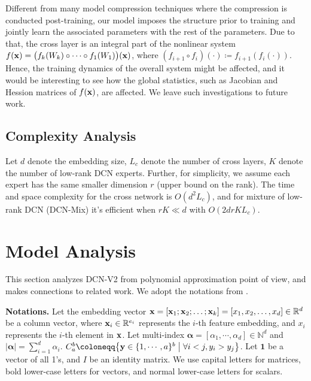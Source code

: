 \documentclass[sigconf]{acmart}
\newcommand{\vecx}{{\bf x}}
\newcommand{\vecy}{{\bf y}}
\newcommand{\vecalpha}{{\bm \alpha}}
\begin{document}
Different from many model compression techniques where the compression is conducted post-training, our model imposes the structure prior to training and jointly learn the associated parameters with the rest of the parameters. Due to that, the cross layer is an integral part of the nonlinear system $f(\vecx) = \big(f_k(W_k) \circ \cdots \circ f_1(W_1)\big) (\vecx)$, where $(f_{i+1} \circ f_{i}) (\cdot) \coloneqq f_{i+1}(f_i(\cdot))$. Hence, the training dynamics of the overall system might be affected, and it would be interesting to see how the global statistics, such as Jacobian and Hession matrices of $f(\vecx)$, are affected. We leave such investigations to future work.






\subsection{Complexity Analysis}
Let $d$ denote the embedding size, $L_c$ denote the number of cross layers, $K$ denote the number of low-rank DCN experts. Further, for simplicity, we assume each expert has the same smaller dimension $r$ (upper bound on the rank). 
The time and space complexity for the cross network is $O(d^2 L_c)$, and for mixture of low-rank DCN ({DCN-Mix}) it's efficient when $rK \ll d$ with $O(2drKL_c)$. 





\section{Model Analysis}
\label{sec:dcn_analysis}
This section analyzes {DCN-V2} from polynomial approximation point of view, and makes connections to related work. We adopt the notations from \cite{wang2017deep}.

{\bf Notations.} Let the embedding vector $\vecx = [\vecx_1; \vecx_2; \ldots; \vecx_k] = [x_1, x_2, \ldots, x_d] \in \mathbb{R}^d$ be a column vector, where $\vecx_i \in \mathbb{R}^{e_i}$ represents the $i$-th feature embedding, and $x_i$ represents the $i$-th element in $\vecx$. Let multi-index $\vecalpha = [\alpha_1, \cdots, \alpha_d] \in \mathbb{N}^d$ and $|\vecalpha| = \sum_{i=1}^d \alpha_i$. $C_a^b \coloneqq \bigl\{\vecy \in \{1,\cdots, a\}^b \mathrel{\big|} \forall i < j, y_i > y_j  \bigr\}$. Let $\mathbf{1}$ be a vector of all 1's, and $I$ be an identity matrix. We use capital letters for matrices, bold lower-case letters for vectors, and normal lower-case letters for scalars.
\end{document}
